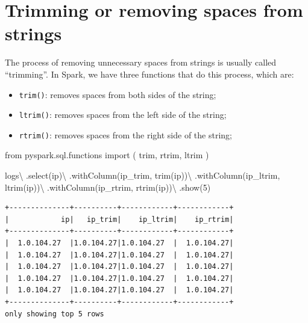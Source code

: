 \documentclass[
  11pt,
  letterpaper,
  DIV=11,
  numbers=noendperiod]{scrreprt}
\newenvironment{Shaded}{\begin{snugshade}}{\end{snugshade}}
\newcommand{\DecValTok}[1]{\textcolor[rgb]{0.68,0.00,0.00}{#1}}
\newcommand{\ImportTok}[1]{\textcolor[rgb]{0.00,0.46,0.62}{#1}}
\newcommand{\NormalTok}[1]{\textcolor[rgb]{0.00,0.23,0.31}{#1}}
\newcommand{\OperatorTok}[1]{\textcolor[rgb]{0.37,0.37,0.37}{#1}}
\newcommand{\StringTok}[1]{\textcolor[rgb]{0.13,0.47,0.30}{#1}}
\providecommand{\tightlist}{%
  \setlength{\itemsep}{0pt}\setlength{\parskip}{0pt}}\usepackage{longtable,booktabs,array}
\begin{document}
\hypertarget{trimming-or-removing-spaces-from-strings}{%
\section{Trimming or removing spaces from
strings}\label{trimming-or-removing-spaces-from-strings}}

The process of removing unnecessary spaces from strings is usually
called ``trimming''. In Spark, we have three functions that do this
process, which are:

\begin{itemize}
\tightlist
\item
  \texttt{trim()}: removes spaces from both sides of the string;
\item
  \texttt{ltrim()}: removes spaces from the left side of the string;
\item
  \texttt{rtrim()}: removes spaces from the right side of the string;
\end{itemize}

\begin{Shaded}
\begin{Highlighting}[]
\ImportTok{from}\NormalTok{ pyspark.sql.functions }\ImportTok{import}\NormalTok{ (}
\NormalTok{    trim, rtrim, ltrim}
\NormalTok{)}

\NormalTok{logs}\OperatorTok{\textbackslash{}}
\NormalTok{    .select(}\StringTok{\textquotesingle{}ip\textquotesingle{}}\NormalTok{)}\OperatorTok{\textbackslash{}}
\NormalTok{    .withColumn(}\StringTok{\textquotesingle{}ip\_trim\textquotesingle{}}\NormalTok{, trim(}\StringTok{\textquotesingle{}ip\textquotesingle{}}\NormalTok{))}\OperatorTok{\textbackslash{}}
\NormalTok{    .withColumn(}\StringTok{\textquotesingle{}ip\_ltrim\textquotesingle{}}\NormalTok{, ltrim(}\StringTok{\textquotesingle{}ip\textquotesingle{}}\NormalTok{))}\OperatorTok{\textbackslash{}}
\NormalTok{    .withColumn(}\StringTok{\textquotesingle{}ip\_rtrim\textquotesingle{}}\NormalTok{, rtrim(}\StringTok{\textquotesingle{}ip\textquotesingle{}}\NormalTok{))}\OperatorTok{\textbackslash{}}
\NormalTok{    .show(}\DecValTok{5}\NormalTok{)}
\end{Highlighting}
\end{Shaded}

\begin{verbatim}
+--------------+----------+------------+------------+
|            ip|   ip_trim|    ip_ltrim|    ip_rtrim|
+--------------+----------+------------+------------+
|  1.0.104.27  |1.0.104.27|1.0.104.27  |  1.0.104.27|
|  1.0.104.27  |1.0.104.27|1.0.104.27  |  1.0.104.27|
|  1.0.104.27  |1.0.104.27|1.0.104.27  |  1.0.104.27|
|  1.0.104.27  |1.0.104.27|1.0.104.27  |  1.0.104.27|
|  1.0.104.27  |1.0.104.27|1.0.104.27  |  1.0.104.27|
+--------------+----------+------------+------------+
only showing top 5 rows
\end{verbatim}
\end{document}
